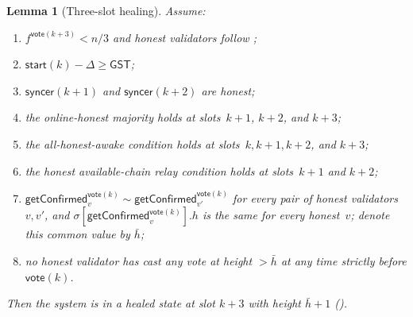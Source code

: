 \ifx\litemode\undefined\documentclass{article}\fi
\newcommand{\syncer}{\mathsf{syncer}}
\newcommand{\start}{\mathsf{start}}
\newcommand{\vote}{\mathsf{vote}}
\newcommand{\comm}[1]{\bar{#1}}
\newcommand{\getConfirmed}{\textsf{getConfirmed}\xspace}
\theoremstyle{plain}
\newtheorem{lemma}{Lemma}
\theoremstyle{definition}
\theoremstyle{remark}
\newcommand{\GST}{\ensuremath{\mathsf{GST}}}
\newcommand{\OHM}{online-honest majority\xspace}
\newcommand{\HAR}{honest available-chain relay\xspace}
\newcommand{\AHA}{all-honest-awake\xspace}
\begin{document}
\begin{lemma}[Three-slot healing]\label{rev:lem:healing-three-slot}
Assume:
\begin{enumerate}
  \item $f^{\vote(k+3)} < n/3$ and honest validators follow ;
  \item $\start(k) - \Delta \geq \GST$;
  \item $\syncer(k+1)$ and $\syncer(k+2)$ are honest;
  \item the \OHM holds at slots~$k+1$, $k+2$, and $k+3$;
  \item the \AHA condition holds at slots~$k, k+1, k+2$, and $k+3$;
  \item the \HAR condition holds at slots~$k+1$ and $k+2$;
  \item $\getConfirmed_v^{\vote(k)} \sim \getConfirmed_{v'}^{\vote(k)}$ for every pair of honest validators~$v, v'$, and $\sigma[\getConfirmed_v^{\vote(k)}].h$ is the same for every honest~$v$; denote this common value by $\comm{h}$;
  \item no honest validator has cast any vote at height $> \comm{h}$ at any time strictly before $\vote(k)$.
\end{enumerate}
Then the system is in a healed state at slot $k+3$ with height $\comm{h}+1$ ().
\end{lemma}
\end{document}
